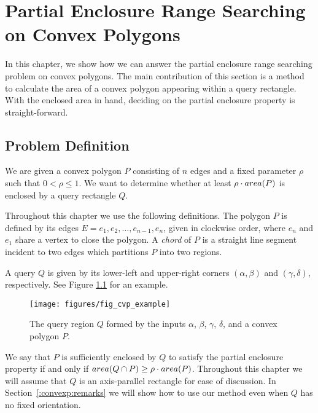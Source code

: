 \chapter{Partial Enclosure Range Searching on Convex Polygons}
\label{:convexp}

In this chapter, we show how we can answer the partial enclosure range searching problem on convex polygons. 
The main contribution of this section is a method to calculate the area of a convex polygon appearing within a query rectangle. 
With the enclosed area in hand, deciding on the partial enclosure property is straight-forward.


\section{Problem Definition}
\label{:convexp:problem-definition}

\begin{problem}
We are given a convex polygon $P$ consisting of $n$ edges and a fixed parameter $\rho$ such that $0 < \rho \leq 1$. We want to determine whether at least $\rho \cdot area(P)$ is enclosed by a query rectangle $Q$.
\end{problem}

Throughout this chapter we use the following definitions. The polygon $P$ is defined by its edges $E = e_1, e_2, \ldots, e_{n-1}, e_n$, given in clockwise order, where $e_n$ and $e_1$ share a vertex to close the polygon.  A \emph{chord} of $P$ is a straight line segment incident to two edges which partitions $P$ into two regions.

A query $Q$ is given by its lower-left and upper-right corners $(\alpha, \beta)$ and $(\gamma, \delta)$, respectively. See Figure \ref{fig:convexp:example} for an example.

\begin{figure}[t]
\begin{center}
  \texttt{[image: figures/fig\_cvp\_example]}
  \caption[A convex polygon $P$ and query box $Q$.]{The query region $Q$ formed by the inputs $\alpha$, $\beta$, $\gamma$,  $\delta$, and a convex polygon $P$.}
  \label{fig:convexp:example}
\end{center}
\end{figure}

We say that $P$ is sufficiently enclosed by $Q$ to satisfy the partial enclosure property if and only if $area(Q \cap P) \geq \rho \cdot area(P)$. 
Throughout this chapter we will assume that $Q$ is an axis-parallel rectangle for ease of discussion. 
In Section~\ref{:convexp:remarks} we will show how to use our method even when $Q$ has no fixed orientation.

